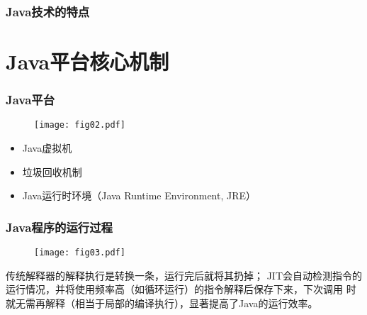 \begin{frame}[fragile]
\frametitle{Java技术的特点}
\begin{description}[<+-| alert@+>]\kai
\item[面向对象] 
\item[平台无关性] 
\item[分布式] 
\item[可靠性] 
\item[多线程] 
\item[网络编程]
\item[编译和解释并存] 
\end{description}
\end{frame}

\section{Java平台核心机制}
\begin{frame}[fragile] %
\frametitle{Java平台}
\begin{figure}
\centering
\texttt{[image: fig02.pdf]}
\end{figure}
\begin{itemize}
\item Java虚拟机
\item 垃圾回收机制
\item Java运行时环境（Java Runtime Environment, JRE）
\end{itemize}
\end{frame}

\begin{frame}[fragile] %
\frametitle{Java程序的运行过程}
\begin{figure}
\centering
\texttt{[image: fig03.pdf]}
\end{figure}
 {\scriptsize 传统解释器的解释执行是转换一条，运行完后就将其扔掉；
  JIT会自动检测指令的运行情况，并将使用频率高（如循环运行）的指令解释后保存下来，下次调用
  时就无需再解释（相当于局部的编译执行），显著提高了Java的运行效率。}
\end{frame}


